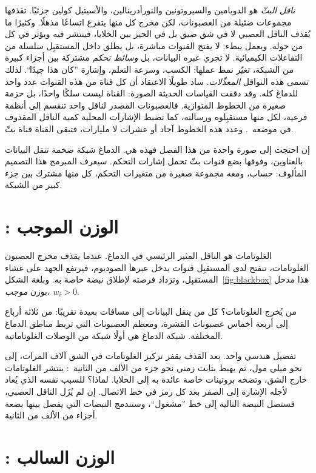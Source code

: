 \emph{ناقل البثّ} هو الدوبامين والسيروتونين والنورأدرينالين، والأسيتيل كولين جزئيًا. تقذفها مجموعات ضئيلة من العصبونات، لكن مخرج كل منها يتفرع اتساعًا مذهلًا. وكثيرًا ما يُقذف الناقل العصبي لا في شق ضيق بل في الحيز بين الخلايا، فينتشر فيه ويؤثر في كل من حوله. ويعمل ببطء: لا يفتح القنوات مباشرة، بل يطلق داخل المستقبِل سلسلة من التفاعلات الكيميائية. لا تجري عبره البيانات، بل \emph{وسائط تحكم} مشتركة بين أجزاء كبيرة من الشبكة، تغيّر نمط عملها: الكسب، وسرعة التعلم، وإشارة ”كان هذا جيدًا“. لذلك تسمى هذه النواقل \emph{المعدِّلات}. ساد طويلًا الاعتقاد أن كل قناة من هذه القنوات عدد واحد للدماغ كله. وقد دققت القياسات الحديثة الصورة: القناة ليست سلكًا واحدًا، بل حزمة صغيرة من الخطوط المتوازية. فالعصبونات المصدر لناقل واحد تنقسم إلى أنظمة فرعية، لكل منها مستقبِلوه ورسالته، كما تضبط الإشارات المحلية كمية الناقل المقذوف في موضعه~\cite{Ren2018,Poe2020}. وعدد هذه الخطوط آحاد أو عشرات لا مليارات، فتبقى القناة قناة بثّ.

إن احتجت إلى صورة واحدة من هذا الفصل فهذه هي. الدماغ شبكة ضخمة تنقل البيانات بالعناوين، وفوقها بضع قنوات بثّ تحمل إشارات التحكم. سيعرف المبرمج هذا التصميم المألوف: حساب، ومعه مجموعة صغيرة من متغيرات التحكم، كل منها مشترك بين جزء كبير من الشبكة.

\section{: الوزن الموجب}

الغلوتامات هو الناقل المثير الرئيسي في الدماغ. عندما يقذف مخرج العصبون الغلوتامات، تنفتح لدى المستقبِل قنوات يدخل عبرها الصوديوم، فيرتفع الجهد على غشاء المستقبِل، وتزداد فرصته لإطلاق نبضة خاصة به. وبلغة الشكل~\ref{fig:blackbox} هذا مدخل بوزن \emph{موجب}، $w_i>0$.

من يُخرج الغلوتامات؟ كل من ينقل البيانات إلى مسافات بعيدة تقريبًا: من ثلاثة أرباع إلى أربعة أخماس عصبونات القشرة، ومعظم العصبونات التي تربط مناطق الدماغ المختلفة. شبكة الدماغ هي أولًا شبكة من الوصلات الغلوتاماتية.

تفصيل هندسي واحد. بعد القذف يقفز تركيز الغلوتامات في الشق آلاف المرات، إلى نحو ميلي مول، ثم يهبط بثابت زمني نحو جزء من الألف من الثانية~\cite{Clements1992}: ينتشر الغلوتامات خارج الشق، وتضخه بروتينات خاصة عائدة به إلى الخلايا. لماذا؟ للسبب نفسه الذي يُعاد لأجله الإشارة إلى الصفر بعد كل رمز في خط الاتصال. إن لم يُزَل الناقل العصبي، فستصل النبضة التالية إلى خط ”مشغول“، وستندمج النبضات التي يفصل بينها بضعة أجزاء من الألف من الثانية.

\section{: الوزن السالب}

